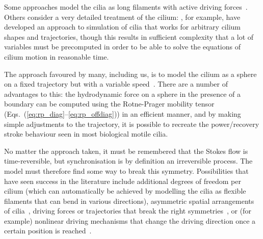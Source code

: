 Some approaches model the cilia as long filaments with active driving forces~. Others consider a very detailed treatment of the cilium: , for example, have developed an approach to simulation of cilia that works for arbitrary cilium shapes and trajectories, though this results in sufficient complexity that a lot of variables must be precomputed in order to be able to solve the equations of cilium motion in reasonable time.

The approach favoured by many, including us, is to model the cilium as a sphere on a fixed trajectory but with a variable speed~. There are a number of advantages to this: the hydrodynamic force on a sphere in the presence of a boundary can be computed using the Rotne-Prager mobility tensor (Eqs.~(\ref{eq:rp_diag}--\ref{eq:rp_offdiag})) in an efficient manner, and by making simple adjustments to the trajectory, it is possible to recreate the power/recovery stroke behaviour seen in most biological motile cilia.

No matter the approach taken, it must be remembered that the Stokes flow is time-reversible, but synchronisation is by definition an irreversible process. The model must therefore find some way to break this symmetry. Possibilities that have seen success in the literature include additional degrees of freedom per cilium (which can automatically be achieved by modelling the cilia as flexible filaments that can bend in various directions), asymmetric spatial arrangements of cilia~\cite{vilfan_hydrodynamic_2006}, driving forces or trajectories that break the right symmetries~\cite{fruchart_non-reciprocal_2021, kanale_spontaneous_2022}, or (for example) nonlinear driving mechanisms that change the driving direction once a certain position is reached~.

